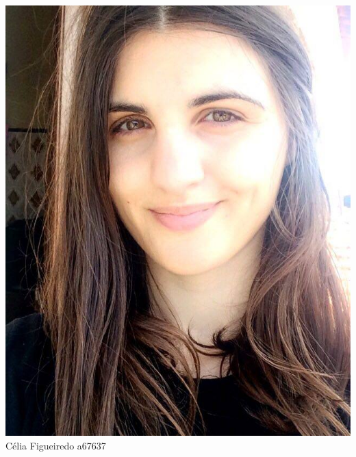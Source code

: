 \begin{titlepage}
\begin{center}
\noindent\begin{minipage}[b]{.1\textwidth}
	\includegraphics[scale=0.12123]{celia}
	\small{Célia Figueiredo a67637}
\end{minipage} 
\hfill
\begin{minipage}[b]{.1\textwidth}

\end{minipage}
\end{center}
\end{titlepage}

